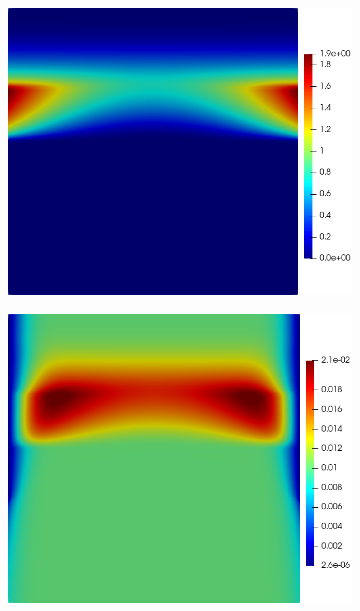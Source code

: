 \documentclass[11pt]{article}
\numberwithin{equation}{section}
\begin{document}
 \begin{figure}[h]
     \centering
     \begin{subfigure}[t]{0.31\textwidth}
     \includegraphics[width=\textwidth]{Figures/testpics/IncreasedZnAbsorbDMA24.png}
     \caption{}
     \label{fig:absup_DMA}
     \end{subfigure}
     \begin{subfigure}[t]{0.31\textwidth}
     \includegraphics[width=\textwidth]{Figures/testpics/IncreasedZnAbsorbZn24.png}

\end{subfigure}
\end{figure}
\end{document}

